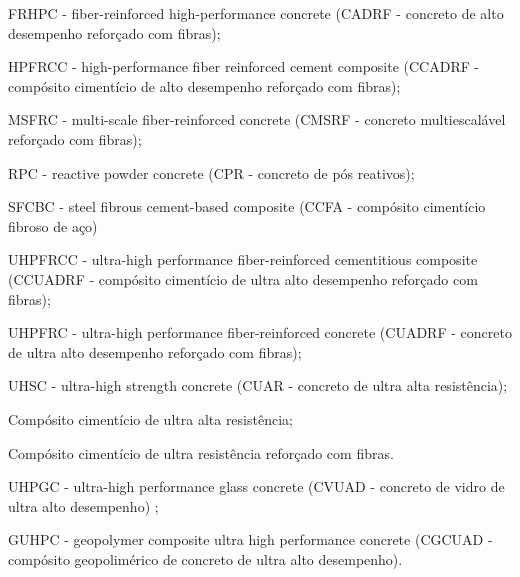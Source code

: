 \begin{alineas}[label=\textbullet]
  \item FRHPC - fiber-reinforced high-performance concrete (CADRF - concreto de alto desempenho reforçado com fibras);
  \item HPFRCC - high-performance fiber reinforced cement composite (CCADRF - compósito cimentício de alto desempenho reforçado com fibras);
  \item MSFRC - multi-scale fiber-reinforced concrete (CMSRF - concreto multiescalável reforçado com fibras);
  \item RPC - reactive powder concrete (CPR - concreto de pós reativos);
  \item SFCBC - steel fibrous cement-based composite (CCFA - compósito cimentício fibroso de aço)
  \item UHPFRCC - ultra-high performance fiber-reinforced cementitious composite (CCUADRF - compósito cimentício de ultra alto desempenho reforçado com fibras);
  \item UHPFRC - ultra-high performance fiber-reinforced concrete (CUADRF - concreto de ultra alto desempenho reforçado com fibras);
  \item UHSC - ultra-high strength concrete (CUAR - concreto de ultra alta resistência);
  \item Compósito cimentício de ultra alta resistência;
  \item Compósito cimentício de ultra resistência reforçado com fibras.
  \item UHPGC - ultra-high performance glass concrete (CVUAD - concreto de vidro de ultra alto desempenho) ;
  \item GUHPC - geopolymer composite ultra high performance concrete (CGCUAD - compósito geopolimérico de concreto de ultra alto desempenho).
\end{alineas}

